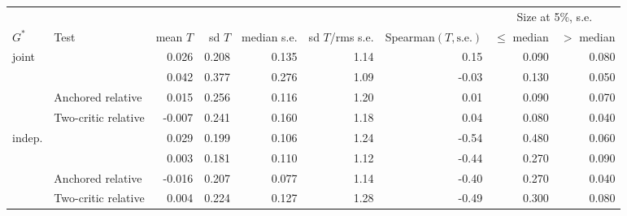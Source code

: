 \begin{tabular}{llrrrrrrr}
\toprule
 & & & & & & & \multicolumn{2}{c}{Size at 5\%, s.e.} \\
\cmidrule(lr){8-9}
$G^*$ & Test & mean $T$ & sd $T$ & median s.e. & sd $T$/rms s.e. & Spearman$(T,\text{s.e.})$ & $\le$ median & $>$ median \\
\midrule
joint & \WC{} & 0.026 & 0.208 & 0.135 & 1.14 & 0.15 & 0.090 & 0.080 \\
 & \LRC{} & 0.042 & 0.377 & 0.276 & 1.09 & -0.03 & 0.130 & 0.050 \\
 & Anchored relative & 0.015 & 0.256 & 0.116 & 1.20 & 0.01 & 0.090 & 0.070 \\
 & Two-critic relative & -0.007 & 0.241 & 0.160 & 1.18 & 0.04 & 0.080 & 0.040 \\
\addlinespace[2pt]
indep. & \WC{} & 0.029 & 0.199 & 0.106 & 1.24 & -0.54 & 0.480 & 0.060 \\
 & \LRC{} & 0.003 & 0.181 & 0.110 & 1.12 & -0.44 & 0.270 & 0.090 \\
 & Anchored relative & -0.016 & 0.207 & 0.077 & 1.14 & -0.40 & 0.270 & 0.040 \\
 & Two-critic relative & 0.004 & 0.224 & 0.127 & 1.28 & -0.49 & 0.300 & 0.080 \\
\bottomrule
\end{tabular}
